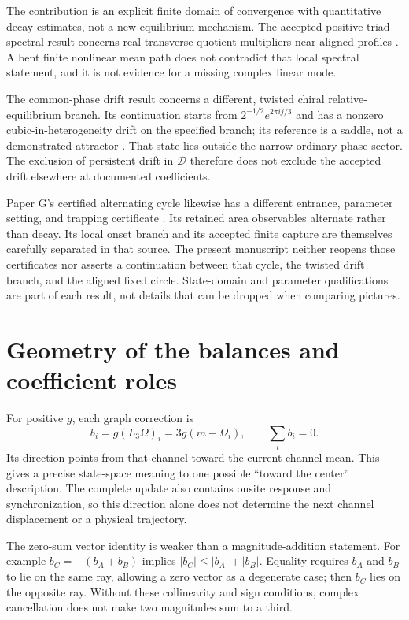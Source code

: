 \documentclass[11pt,a4paper]{article}
\numberwithin{equation}{section}
\theoremstyle{remark}\newtheorem{remark}[theorem]{Remark}
\begin{document}
The contribution is an explicit finite domain of convergence with quantitative decay estimates, not a new equilibrium mechanism. The accepted positive-triad spectral result concerns real transverse quotient multipliers near aligned profiles \cite{spectral}. A bent finite nonlinear mean path does not contradict that local spectral statement, and it is not evidence for a missing complex linear mode.

The common-phase drift result concerns a different, twisted chiral relative-equilibrium branch. Its continuation starts from $2^{-1/2}e^{2\pi i j/3}$ and has a nonzero cubic-in-heterogeneity drift on the specified branch; its reference is a saddle, not a demonstrated attractor \cite[labels D1--D4 and D39--D45]{drift}. That state lies outside the narrow ordinary phase sector. The exclusion of persistent drift in $\mathcal D$ therefore does not exclude the accepted drift elsewhere at documented coefficients.

Paper G's certified alternating cycle likewise has a different entrance, parameter setting, and trapping certificate \cite{paperG}. Its retained area observables alternate rather than decay. Its local onset branch and its accepted finite capture are themselves carefully separated in that source. The present manuscript neither reopens those certificates nor asserts a continuation between that cycle, the twisted drift branch, and the aligned fixed circle. State-domain and parameter qualifications are part of each result, not details that can be dropped when comparing pictures.

\section{Geometry of the balances and coefficient roles}\label{sec:roles}

For positive $g$, each graph correction is
\begin{equation}
b_i=g(L_3\Omega)_i=3g(m-\Omega_i),\qquad\sum_i b_i=0.\label{eq:graphgeometry}
\end{equation}
Its direction points from that channel toward the current channel mean. This gives a precise state-space meaning to one possible ``toward the center'' description. The complete update also contains onsite response and synchronization, so this direction alone does not determine the next channel displacement or a physical trajectory.

The zero-sum vector identity is weaker than a magnitude-addition statement. For example $b_C=-(b_A+b_B)$ implies $|b_C|\le|b_A|+|b_B|$. Equality requires $b_A$ and $b_B$ to lie on the same ray, allowing a zero vector as a degenerate case; then $b_C$ lies on the opposite ray. Without these collinearity and sign conditions, complex cancellation does not make two magnitudes sum to a third.
\end{document}
